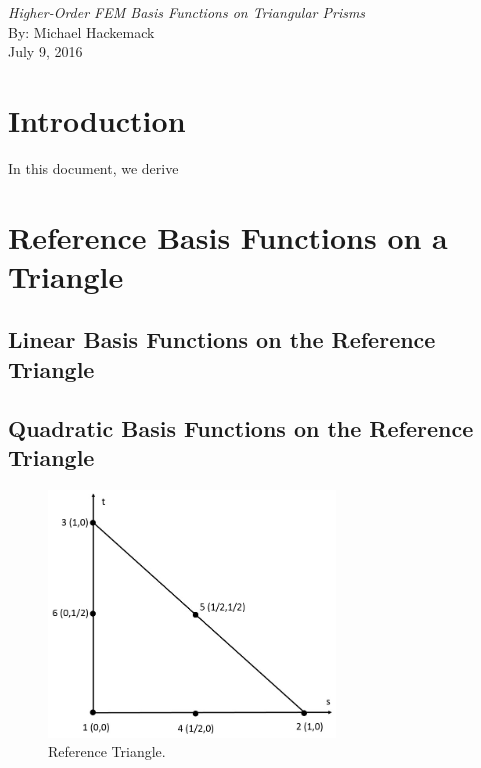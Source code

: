 \documentclass[11pt]{article}
\begin{document}
\begin{center}
{\em \huge Higher-Order FEM Basis Functions on Triangular Prisms}\\[8mm]
{\LARGE By: Michael Hackemack}\\[3mm]
{\large July 9, 2016} \\[15mm]
\end{center}



\section{Introduction}
\label{sec::Introduction}

In this document, we derive 

\section{Reference Basis Functions on a Triangle}
\label{sec::triref}

\subsection{Linear Basis Functions on the Reference Triangle}
\label{sec::triref_linear}




\subsection{Quadratic Basis Functions on the Reference Triangle}
\label{sec::triref_quadratic}


\begin{figure}[hbt]
\centering
	\includegraphics[width=3.0in]{./Figures/ref_triangle.jpg}
	\caption{Reference Triangle.}
\hspace{0.5cm}
\label{fig::ref_triangle}
\end{figure}
\end{document}

